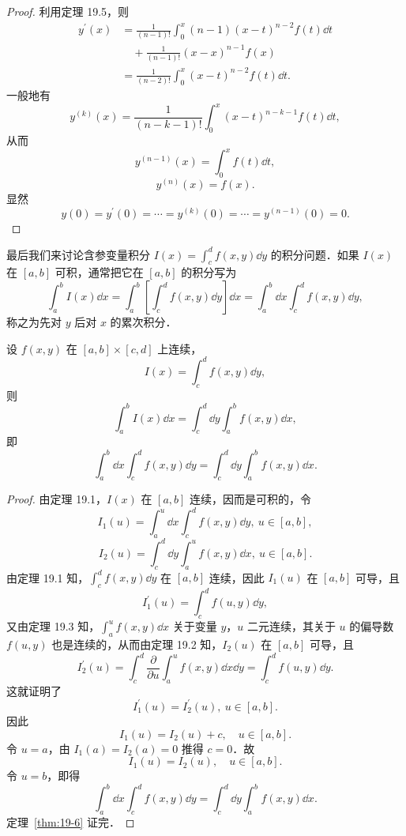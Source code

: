 \begin{proof}
利用定理 19.5，则
\[
\begin{aligned}
y^{\prime}(x)&=\frac{1}{(n-1)!}\int_{0}^{x}(n-1)(x-t)^{n-2}f(t)\dd t\\
&\quad+\frac{1}{(n-1)!}(x-x)^{n-1}f(x)\\
&=\frac{1}{(n-2)!}\int_{0}^{x}(x-t)^{n-2}f(t)\dd t.
\end{aligned}
\]
一般地有
\[
y^{(k)}(x)=\frac{1}{(n-k-1)!}\int_{0}^{x}(x-t)^{n-k-1}f(t)\dd t,
\]
从而
\[
y^{(n-1)}(x)=\int_{0}^{x}f(t)\dd t,
\]
\[
y^{(n)}(x)=f(x).
\]
显然
\[
y(0)=y^{\prime}(0)=\cdots=y^{(k)}(0)=\cdots=y^{(n-1)}(0)=0.
\]
\end{proof}

最后我们来讨论含参变量积分 $I(x)=\int_{c}^{d}f(x,y)\dd y$ 的积分问题．如果 $I(x)$ 在 $[a,b]$ 可积，通常把它在 $[a,b]$ 的积分写为
\[
\int_{a}^{b}I(x)\dd x=\int_{a}^{b}\left[\int_{c}^{d}f(x,y)\dd y\right]\dd x=\int_{a}^{b}\dd x\int_{c}^{d}f(x,y)\dd y,
\]
称之为先对 $y$ 后对 $x$ 的累次积分．

\begin{theorem}[积分交换次序]\label{thm:19-6}
设 $f(x,y)$ 在 $[a,b]\times[c,d]$ 上连续，
\[
I(x)=\int_{c}^{d}f(x,y)\dd y,
\]
则
\[
\int_{a}^{b}I(x)\dd x=\int_{c}^{d}\dd y\int_{a}^{b}f(x,y)\dd x,
\]
即
\[
\int_{a}^{b}\dd x\int_{c}^{d}f(x,y)\dd y=\int_{c}^{d}\dd y\int_{a}^{b}f(x,y)\dd x.
\]
\end{theorem}

\begin{proof}
由定理 19.1，$I(x)$ 在 $[a,b]$ 连续，因而是可积的，令
\[
I_{1}(u)=\int_{a}^{u}\dd x\int_{c}^{d}f(x,y)\dd y,\ u\in[a,b],
\]
\[
I_{2}(u)=\int_{c}^{d}\dd y\int_{a}^{u}f(x,y)\dd x,\ u\in[a,b].
\]
由定理 19.1 知，$\displaystyle\int_{c}^{d}f(x,y)\dd y$ 在 $[a,b]$ 连续，因此 $I_{1}(u)$ 在 $[a,b]$ 可导，且
\[
I_{1}^{\prime}(u)=\int_{c}^{d}f(u,y)\dd y,
\]
又由定理 19.3 知，$\displaystyle\int_{a}^{u}f(x,y)\dd x$ 关于变量 $y$，$u$ 二元连续，其关于 $u$ 的偏导数 $f(u,y)$ 也是连续的，从而由定理 19.2 知，$I_{2}(u)$ 在 $[a,b]$ 可导，且
\[
I_{2}^{\prime}(u)=\int_{c}^{d}\frac{\partial}{\partial u}\int_{a}^{u}f(x,y)\dd x\dd y=\int_{c}^{d}f(u,y)\dd y.
\]
这就证明了
\[
I_{1}^{\prime}(u)=I_{2}^{\prime}(u),\ u\in[a,b].
\]
因此
\[
I_{1}(u)=I_{2}(u)+c,\quad u\in[a,b].
\]
令 $u=a$，由 $I_{1}(a)=I_{2}(a)=0$ 推得 $c=0$．故
\[
I_{1}(u)=I_{2}(u),\quad u\in[a,b].
\]
令 $u=b$，即得
\[
\int_{a}^{b}\dd x\int_{c}^{d}f(x,y)\dd y=\int_{c}^{d}\dd y\int_{a}^{b}f(x,y)\dd x.
\]
定理~\ref{thm:19-6} 证完．
\end{proof}

